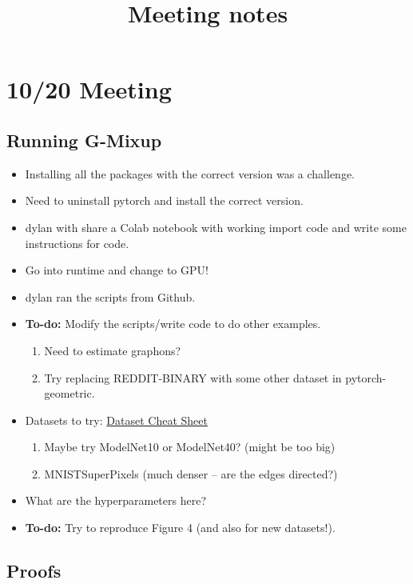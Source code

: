 \documentclass[12pt]{amsart}
\title{Meeting notes}
\begin{document}
\maketitle


\section{10/20 Meeting}

\subsection{Running G-Mixup}

\begin{itemize}
    \item Installing all the packages with the correct version was a challenge.
    \item Need to uninstall pytorch and install the correct version.
    \item dylan with share a Colab notebook with working import code and write some instructions for code.
    \item Go into runtime and change to GPU!
    \item dylan ran the scripts from Github.
    \item \textbf{To-do:} Modify the scripts/write code to do other examples.
    \begin{enumerate}
        \item Need to estimate graphons?
        \item Try replacing REDDIT-BINARY with some other dataset in pytorch-geometric.
    \end{enumerate}
    \item Datasets to try: \href{https://pytorch-geometric.readthedocs.io/en/latest/notes/data_cheatsheet.html}{Dataset Cheat Sheet}
    \begin{enumerate}
        \item Maybe try ModelNet10 or ModelNet40? (might be too big)
        \item MNISTSuperPixels (much denser -- are the edges directed?)
    \end{enumerate}
    \item What are the hyperparameters here?
    \item \textbf{To-do:} Try to reproduce Figure 4 (and also for new datasets!).
\end{itemize}

\subsection{Proofs}
\end{document}
